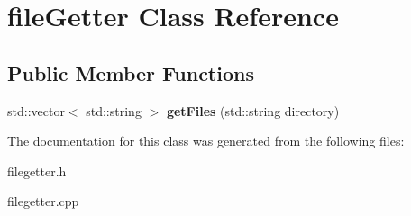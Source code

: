 \hypertarget{classfileGetter}{}\section{file\+Getter Class Reference}
\label{classfileGetter}
\subsection*{Public Member Functions}
\begin{DoxyCompactItemize}
\item 
\mbox{\label{classfileGetter_a2ab6fdcd4ae9377b24f51c35497dfd49}} 
std\+::vector$<$ std\+::string $>$ {\bfseries get\+Files} (std\+::string directory)
\end{DoxyCompactItemize}


The documentation for this class was generated from the following files\+:\begin{DoxyCompactItemize}
\item 
filegetter.\+h\item 
filegetter.\+cpp\end{DoxyCompactItemize}
